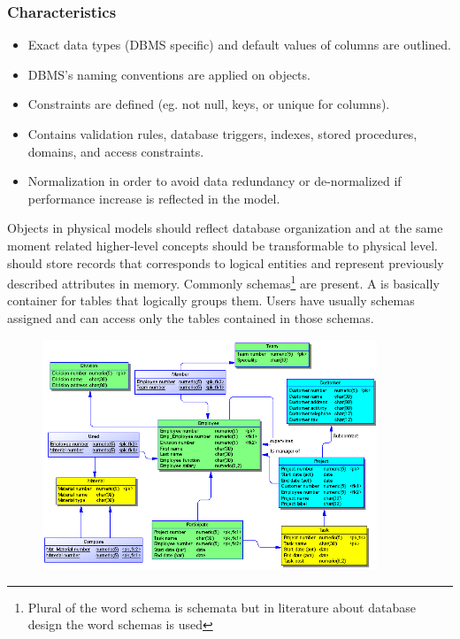 \subsubsection{Characteristics}
\begin{itemize}
	\item Exact data types (DBMS specific) and default values of columns are outlined.
	\item DBMS's naming conventions are applied on objects.
	\item Constraints are defined (eg. not null, keys, or unique for columns).
	\item Contains validation rules, database triggers, indexes, stored procedures, domains, and access constraints.
	\item Normalization in order to avoid data redundancy or de-normalized if performance increase is reflected in the model.
\end{itemize}

Objects in physical models should reflect database organization and at the same moment related higher-level concepts should be transformable to physical level.  should store records that corresponds to logical entities and  represent previously described attributes in memory.
Commonly schemas\footnote{Plural of the word schema is schemata but in literature about database design the word schemas is used} are present. A  is basically container for tables that logically groups them. Users have usually schemas assigned and can access only the tables contained in those schemas.

\begin{figure}[H]
	\centering
	\includegraphics[width=10cm]{../img/Physical_Model_PowerDesigner}
	\caption{\cite{PhysicalModelExample}}
\end{figure}

